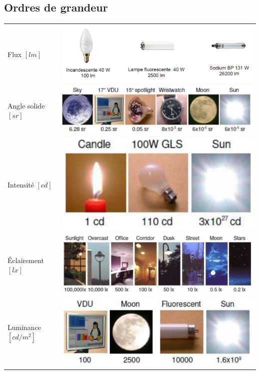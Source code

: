 \documentclass[11pt]{report}
\begin{document}
\subsection{Ordres de grandeur}
\begin{tabular}{m{3.5cm}m{13cm}}
Flux $[lm]$ & \includegraphics[scale=0.4]{lm} \\
Angle solide $[sr]$ & \includegraphics[scale=0.4]{sr} \\
Intensité $[cd]$ & \includegraphics[scale=0.3]{cd} \\
Éclairement $[lx]$ & \includegraphics[scale=0.35]{lux}\\
Luminance $[cd/m^2]$ & \includegraphics[scale=0.35]{cdm2} \\
\end{tabular}
\end{document}
